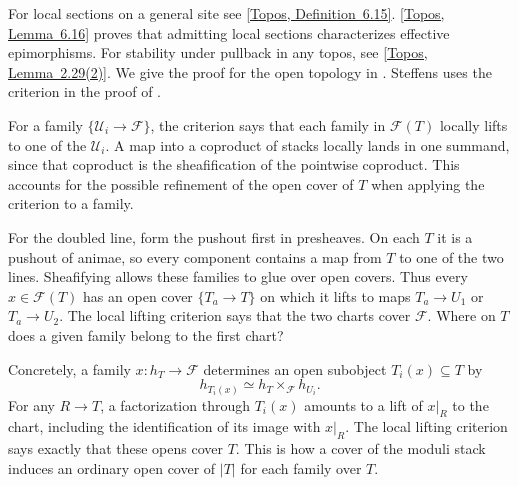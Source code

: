 For local sections on a general site see
\href{https://animarium.org/tag/028R/}{[Topos, Definition~6.15]}.
\href{https://animarium.org/tag/028S/}{[Topos, Lemma~6.16]} proves
that admitting local sections characterizes effective epimorphisms.
For stability under pullback in any topos, see
\href{https://animarium.org/tag/020W/}{[Topos, Lemma~2.29(2)]}.
We give the proof for the open topology in
. Steffens uses the criterion
in the proof of \cite[Corollary~2.1.49]{Steffens_Representability_Elliptic_Moduli}.

For a family $\{\mathcal U_i\to\mathcal F\}$, the criterion says
that each family in $\mathcal F(T)$ locally lifts to one of the
$\mathcal U_i$. A map into a coproduct of stacks locally lands in
one summand, since that coproduct is the sheafification of the
pointwise coproduct. This accounts for the possible refinement of
the open cover of $T$ when applying the criterion to a family.

For the doubled line, form the pushout first in presheaves. On each
$T$ it is a pushout of animae, so every component contains a map from
$T$ to one of the two lines. Sheafifying allows these families to glue
over open covers. Thus every $x\in\mathcal F(T)$ has an open cover
$\{T_a\to T\}$ on which it lifts to maps $T_a\to U_1$ or $T_a\to U_2$.
The local lifting criterion says that the two charts cover $\mathcal F$.
Where on $T$ does a given family belong to the first chart?


Concretely, a family $x\colon h_T\to\mathcal F$ determines an open
subobject $T_i(x)\subseteq T$ by
\[
 h_{T_i(x)}\simeq h_T\times_{\mathcal F}h_{U_i}.
\]
For any $R\to T$, a factorization through $T_i(x)$ amounts to a lift of
$x|_R$ to the chart, including the identification of its image with
$x|_R$. The local lifting criterion says exactly that these opens
cover $T$. This is how a cover of the moduli stack induces an ordinary
open cover of $|T|$ for each family over $T$.

